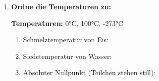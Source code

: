 \begin{enumerate}[label=\arabic*.]
    \item \textbf{Ordne die Temperaturen zu:}
    \vspace{0.5cm}

    \textbf{Temperaturen:} 0°C, 100°C, -273°C

    \begin{enumerate}[label=\alph*)]
        \item Schmelztemperatur von Eis: \underline{\hspace{3cm}}
        \item Siedetemperatur von Wasser: \underline{\hspace{3cm}}
        \item Absoluter Nullpunkt (Teilchen stehen still): \underline{\hspace{3cm}}
    \end{enumerate}

\end{enumerate}